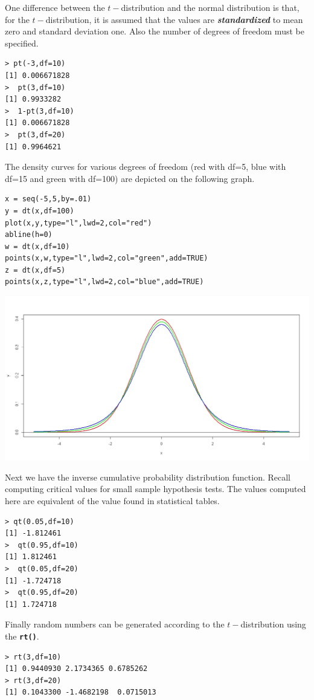\documentclass[a4paper,12pt]{article}
\begin{document}
One difference between the $t-$distribution and the normal distribution is that, for the $t-$distribution, it is assumed that the values are \textit{\textbf{standardized }}to mean zero and standard deviation one.
Also the number of degrees of freedom must be specified. 

\begin{verbatim}
> pt(-3,df=10)
[1] 0.006671828
>  pt(3,df=10)
[1] 0.9933282
>  1-pt(3,df=10)
[1] 0.006671828
>  pt(3,df=20)
[1] 0.9964621
\end{verbatim}
The density curves for various degrees of freedom (red with df=5, blue with df=15 and green with df=100) are depicted on the following graph.
\begin{framed}
\begin{verbatim}
x = seq(-5,5,by=.01)
y = dt(x,df=100) 
plot(x,y,type="l",lwd=2,col="red")
abline(h=0)
w = dt(x,df=10) 
points(x,w,type="l",lwd=2,col="green",add=TRUE)
z = dt(x,df=5) 
points(x,z,type="l",lwd=2,col="blue",add=TRUE)
\end{verbatim}
\end{framed}
 \begin{center}
 \includegraphics[scale=0.30]{dtCurve}
 \end{center}
Next we have the inverse cumulative probability distribution function. Recall computing critical values for small sample hypothesis tests. The values computed here are equivalent of the value found in statistical tables.

\begin{verbatim}
> qt(0.05,df=10)
[1] -1.812461
>  qt(0.95,df=10)
[1] 1.812461
>  qt(0.05,df=20)
[1] -1.724718
>  qt(0.95,df=20)
[1] 1.724718
\end{verbatim}
Finally random numbers can be generated according to the $t-$distribution using the \textbf{\texttt{rt()}}.
\begin{verbatim}
> rt(3,df=10)
[1] 0.9440930 2.1734365 0.6785262
> rt(3,df=20)
[1] 0.1043300 -1.4682198  0.0715013
\end{verbatim}
\end{document}
